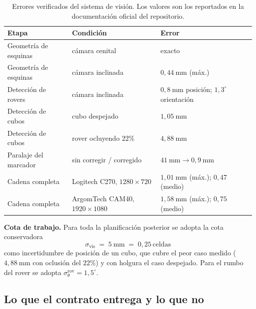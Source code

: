 \documentclass[11pt,a4paper]{article}
\theoremstyle{definition}
\newcommand{\grados}{^{\circ}}
\begin{document}
\begin{table}[htbp]
\centering
\caption{Errores verificados del sistema de visión. Los valores son los reportados en
la documentación oficial del repositorio.}
\begin{tabular}{lll}
\toprule
Etapa & Condición & Error \\
\midrule
Geometría de esquinas & cámara cenital       & exacto \\
Geometría de esquinas & cámara inclinada     & $0{,}44\ \mathrm{mm}$ (máx.) \\
Detección de rovers   & cámara inclinada     & $0{,}8\ \mathrm{mm}$ posición; $1{,}3\grados$ orientación \\
Detección de cubos    & cubo despejado       & $1{,}05\ \mathrm{mm}$ \\
Detección de cubos    & rover ocluyendo $22\%$ & $4{,}88\ \mathrm{mm}$ \\
Paralaje del marcador & sin corregir / corregido & $41\ \mathrm{mm} \to 0{,}9\ \mathrm{mm}$ \\
\midrule
Cadena completa & Logitech C270, $1280\times720$ & $1{,}01\ \mathrm{mm}$ (máx.); $0{,}47$ (medio) \\
Cadena completa & ArgomTech CAM40, $1920\times1080$ & $1{,}58\ \mathrm{mm}$ (máx.); $0{,}75$ (medio) \\
\bottomrule
\end{tabular}
\label{tab:errores}
\end{table}

\begin{resultado}
\textbf{Cota de trabajo.} Para toda la planificación posterior se adopta la cota
conservadora
\[
  \sigma_{\mathrm{vis}} \;=\; 5\ \mathrm{mm} \;=\; 0{,}25\ \text{celdas}
\]
como incertidumbre de posición de un cubo, que cubre el peor caso medido
($4{,}88\ \mathrm{mm}$ con oclusión del $22\%$) y con holgura el caso despejado. Para
el rumbo del rover se adopta $\sigma_\theta^{\mathrm{rov}} = 1{,}5\grados$.
\end{resultado}

\subsection{Lo que el contrato entrega y lo que no}
\label{sec:contrato}
\end{document}
